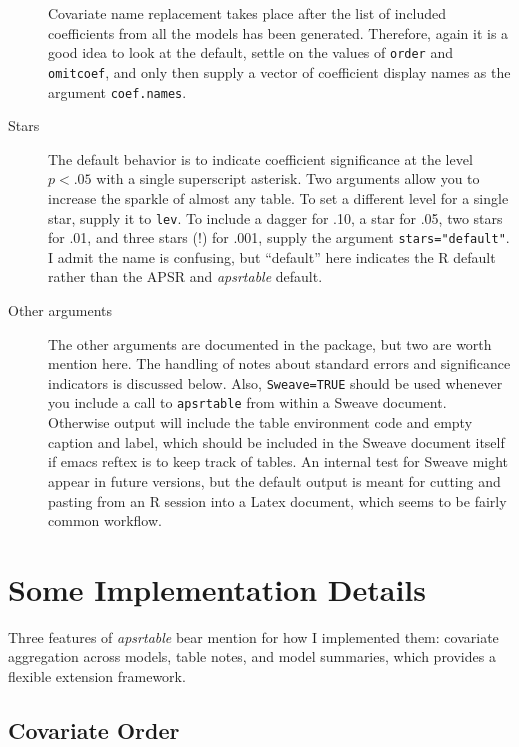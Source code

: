 \documentclass[10pt]{article} %
\begin{document}
\begin{description}
Covariate name replacement takes place after the list of included coefficients from all the models has been generated. Therefore, again it is a good idea to look at the default, settle on the values of \verb|order| and \verb|omitcoef|, and only then supply a vector of coefficient display names as the argument \verb|coef.names|.
\item[Stars] The default behavior is to indicate coefficient significance at the level $p<.05$ with a single superscript asterisk. Two arguments allow you to increase the sparkle of almost any table. To set a different level for a single star, supply it to \verb|lev|. To include a dagger for .10, a star for .05, two stars for .01, and three stars (!) for .001, supply the argument \verb|stars="default"|. I admit the name is confusing, but ``default'' here indicates the R default rather than the APSR and \textit{apsrtable} default.
\item[Other arguments] The other arguments are documented in the package, but two are worth mention here. The handling of notes about standard errors and significance indicators is discussed below. Also, \verb|Sweave=TRUE| should be used whenever you include a call to \verb|apsrtable| from within a Sweave document. Otherwise output will include the table environment code and empty caption and label, which should be included in the Sweave document itself if emacs reftex is to keep track of tables. An internal test for Sweave might appear in future versions, but the default output is meant for cutting and pasting from an R session into a Latex document, which seems to be fairly common workflow.
\end{description}

\section{Some Implementation Details}
\label{sec:implementation}
Three features of \textit{apsrtable} bear mention for how I implemented them: covariate aggregation across models, table notes, and model summaries, which provides a flexible extension framework.

\subsection{Covariate Order}
\label{sec:covariate-order}
\end{document}
